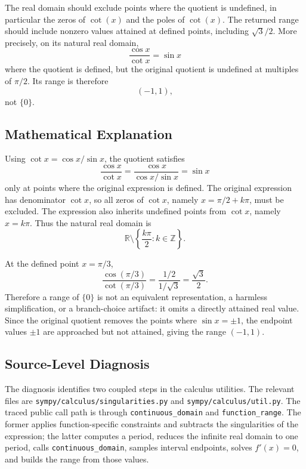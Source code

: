 \documentclass[11pt]{article}
\begin{document}
The real domain should exclude points where the quotient is undefined, in particular the zeros of \(\cot(x)\) and the poles of \(\cot(x)\). The returned range should include nonzero values attained at defined points, including \(\sqrt{3}/2\). More precisely, on its natural real domain,
\[
  \frac{\cos x}{\cot x} = \sin x
\]
where the quotient is defined, but the original quotient is undefined at multiples of \(\pi/2\). Its range is therefore
\[
  (-1,1),
\]
not \(\{0\}\).

\subsection{Mathematical Explanation}

Using \(\cot x = \cos x/\sin x\), the quotient satisfies
\[
  \frac{\cos x}{\cot x}
  = \frac{\cos x}{\cos x/\sin x}
  = \sin x
\]
only at points where the original expression is defined. The original expression has denominator \(\cot x\), so all zeros of \(\cot x\), namely \(x=\pi/2+k\pi\), must be excluded. The expression also inherits undefined points from \(\cot x\), namely \(x=k\pi\). Thus the natural real domain is
\[
  \mathbb{R}\setminus \left\{ \frac{k\pi}{2} : k\in\mathbb{Z} \right\}.
\]

At the defined point \(x=\pi/3\),
\[
  \frac{\cos(\pi/3)}{\cot(\pi/3)}
  = \frac{1/2}{1/\sqrt{3}}
  = \frac{\sqrt{3}}{2}.
\]
Therefore a range of \(\{0\}\) is not an equivalent representation, a harmless simplification, or a branch-choice artifact: it omits a directly attained real value. Since the original quotient removes the points where \(\sin x=\pm 1\), the endpoint values \(\pm 1\) are approached but not attained, giving the range \((-1,1)\).

\subsection{Source-Level Diagnosis}

\begin{sloppypar}
The diagnosis identifies two coupled steps in the calculus utilities. The relevant files are \nolinkurl{sympy/calculus/singularities.py} and \nolinkurl{sympy/calculus/util.py}. The traced public call path is through \texttt{continuous\_domain} and \texttt{function\_range}. The former applies function-specific constraints and subtracts the singularities of the expression; the latter computes a period, reduces the infinite real domain to one period, calls \texttt{continuous\_domain}, samples interval endpoints, solves \(f'(x)=0\), and builds the range from those values.
\end{sloppypar}
\end{document}

